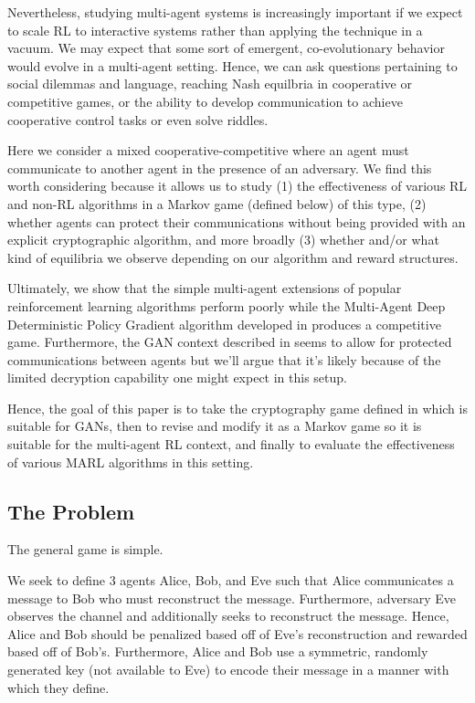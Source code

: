 \documentclass{llncs}
\begin{document}
Nevertheless, studying multi-agent systems is increasingly important if we expect to scale RL to interactive systems rather than applying the technique in a vacuum. We may expect that some sort of emergent, co-evolutionary behavior would evolve in a multi-agent setting. Hence, we can ask questions pertaining to social dilemmas\cite{leibo2017multi} and language\cite{foerster2016learning}, reaching Nash equilbria in cooperative or competitive games\cite{pinto2017robust}, or the ability to develop communication to achieve cooperative control tasks\cite{gupta2017cooperative} or even solve riddles\cite{foerster2016learning}.

Here we consider a mixed cooperative-competitive where an agent must communicate to another agent in the presence of an adversary. We find this worth considering because it allows us to study (1) the effectiveness of various RL and non-RL algorithms in a Markov game (defined below) of this type, (2) whether agents can protect their communications without being provided with an explicit cryptographic algorithm, and more broadly (3) whether and/or what kind of equilibria we observe depending on our algorithm and reward structures. 

Ultimately, we show that the simple multi-agent extensions of popular reinforcement learning algorithms perform poorly while the Multi-Agent Deep Deterministic Policy Gradient algorithm developed in \cite{lowe2017multi} produces a competitive game. Furthermore, the GAN context described in \cite{abadi2016learning} seems to allow for protected communications between agents but we'll argue that it's likely because of the limited decryption capability one might expect in this setup. 

Hence, the goal of this paper is to take the cryptography game defined in \cite{abadi2016learning} which is suitable for GANs, then to revise and modify it as a Markov game so it is suitable for the multi-agent RL context, and finally to evaluate the effectiveness of various MARL algorithms in this setting.
\subsection{The Problem}
%
The general game is simple.

We seek to define 3 agents Alice, Bob, and Eve such that Alice communicates a message to Bob who must reconstruct the message. Furthermore, adversary Eve observes the channel and additionally seeks to reconstruct the message. Hence, Alice and Bob should be penalized based off of Eve's reconstruction and rewarded based off of Bob's. Furthermore, Alice and Bob use a symmetric, randomly generated key (not available to Eve) to encode their message in a manner with which they define. 
\end{document}
